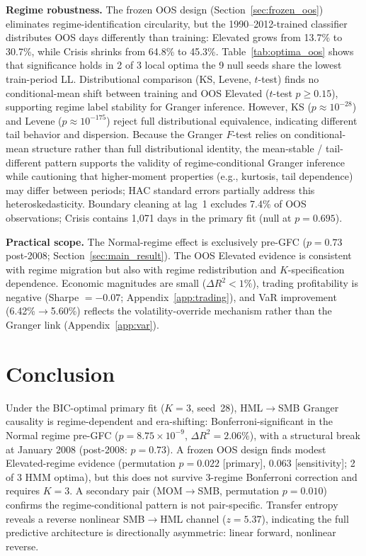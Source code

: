 \documentclass[sigconf,anonymous]{acmart}
\begin{document}
\textbf{Regime robustness.}
The frozen OOS design (Section~\ref{sec:frozen_oos}) eliminates
regime-identification circularity, but the 1990--2012-trained classifier
distributes OOS days differently than training: Elevated grows from 13.7\%
to 30.7\%, while Crisis shrinks from 64.8\% to 45.3\%.
Table~\ref{tab:optima_oos} shows that significance holds in 2 of 3 local optima
the 9 null seeds share the lowest train-period LL.
Distributional comparison (KS, Levene, $t$-test) finds no conditional-mean shift
between training and OOS Elevated ($t$-test $p \geq 0.15$), supporting regime
label stability for Granger inference.
However, KS ($p \approx 10^{-28}$) and Levene ($p \approx 10^{-175}$) reject
full distributional equivalence, indicating different tail behavior and dispersion.
Because the Granger $F$-test relies on conditional-mean structure rather than full distributional
identity, the mean-stable / tail-different pattern supports the validity of regime-conditional
Granger inference while cautioning that higher-moment properties (e.g., kurtosis, tail dependence)
may differ between periods; HAC standard errors partially address this heteroskedasticity.
Boundary cleaning at lag~1 excludes 7.4\% of OOS observations; Crisis contains
1,071 days in the primary fit (null at $p = 0.695$).

\textbf{Practical scope.}
The Normal-regime effect is exclusively pre-GFC ($p = 0.73$ post-2008;
Section~\ref{sec:main_result}). The OOS Elevated evidence is consistent with
regime migration but also with regime redistribution and $K$-specification
dependence. Economic magnitudes are small ($\Delta R^2 < 1\%$),
trading profitability is negative (Sharpe $= -0.07$; Appendix~\ref{app:trading}),
and VaR improvement (6.42\%$\to$5.60\%) reflects the volatility-override
mechanism rather than the Granger link (Appendix~\ref{app:var}).

\section{Conclusion}

Under the BIC-optimal primary fit ($K = 3$, seed~28), HML$\to$SMB Granger causality is regime-dependent and era-shifting: Bonferroni-significant in the Normal regime pre-GFC ($p = 8.75 \times 10^{-9}$, $\Delta R^2 = 2.06\%$), with a structural break at January 2008 (post-2008: $p = 0.73$). A frozen OOS design finds modest Elevated-regime evidence (permutation $p = 0.022$ [primary], $0.063$ [sensitivity]; 2 of 3 HMM optima), but this does not survive 3-regime Bonferroni correction and requires $K = 3$. A secondary pair (MOM$\to$SMB, permutation $p = 0.010$) confirms the regime-conditional pattern is not pair-specific. Transfer entropy reveals a reverse nonlinear SMB$\to$HML channel ($z = 5.37$), indicating the full predictive architecture is directionally asymmetric: linear forward, nonlinear reverse.
\end{document}

